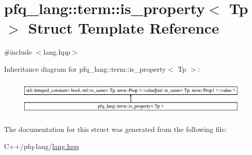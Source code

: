 \hypertarget{structpfq__lang_1_1term_1_1is__property}{\section{pfq\+\_\+lang\+:\+:term\+:\+:is\+\_\+property$<$ Tp $>$ Struct Template Reference}
\label{structpfq__lang_1_1term_1_1is__property}
}


{\ttfamily \#include $<$lang.\+hpp$>$}

Inheritance diagram for pfq\+\_\+lang\+:\+:term\+:\+:is\+\_\+property$<$ Tp $>$\+:\begin{figure}[H]
\begin{center}
\leavevmode
\includegraphics[height=1.794872cm]{structpfq__lang_1_1term_1_1is__property}
\end{center}
\end{figure}


The documentation for this struct was generated from the following file\+:\begin{DoxyCompactItemize}
\item 
C++/pfq-\/lang/\hyperlink{lang_8hpp}{lang.\+hpp}\end{DoxyCompactItemize}
